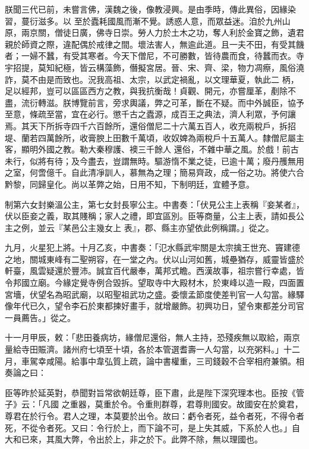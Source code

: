 \begin{pinyinscope}
 朕聞三代已前，未嘗言佛，漢魏之後，像教浸興。是由季時，傳此異俗，因緣染習，蔓衍滋多。以
 至於蠹耗國風而漸不覺。誘惑人意，而眾益迷。洎於九州山原，兩京關，僧徒日廣，佛寺日崇。勞人力於土木之功，奪人利於金寶之飾，遺君親於師資之際，違配偶於戒律之間。壞法害人，無逾此道。且一夫不田，有受其饑者；一婦不蠶，有受其寒者。今天下僧尼，不可勝數，皆待農而食，待蠶而衣。寺宇招提，莫知紀極，皆云構藻飾，僭擬宮居。晉、宋、齊、梁，物力凋瘵，風俗澆詐，莫不由是而致也。況我高祖、太宗，以武定禍亂，以文理華夏，執此二
 柄，足以經邦，豈可以區區西方之教，與我抗衡哉！貞觀、開元，亦嘗厘革，剷除不盡，流衍轉滋。朕博覽前言，旁求輿議，弊之可革，斷在不疑。而中外誠臣，協予至意，條疏至當，宜在必行。懲千古之蠹源，成百王之典法，濟人利眾，予何讓焉。其天下所拆寺四千六百餘所，還俗僧尼二十六萬五百人，收充兩稅戶，拆招堤、蘭若四萬餘所，收膏腴上田數千萬頃，收奴婢為兩稅戶十五萬人。隸僧尼屬主客，顯明外國之教。勒大秦穆護、襖三千餘人
 還俗，不雜中華之風。於戲！前古未行，似將有待；及今盡去，豈謂無時。驅游惰不業之徒，已逾十萬；廢丹雘無用之室，何啻億千。自此清凈訓人，慕無為之理；簡易齊政，成一俗之功。將使六合黔黎，同歸皇化。尚以革弊之始，日用不知，下制明廷，宜體予意。



 制第六女封樂溫公主，第七女封長寧公主。中書奏：「伏見公主上表稱『妾某者』，伏以臣妾之義，取其賤稱；家人之禮，即宜區別。臣等商量，公主上表，請如長公主之例，並云『某邑公主幾女上
 表』，郡、縣主亦望依此例稱謂。」從之。



 九月，火星犯上將。十月乙亥，中書奏：「氾水縣武牢關是太宗擒王世充、竇建德之地，關城東峰有二聖朔容，在一堂之內。伏以山河如舊，城壘猶存，威靈皆盛於軒臺，風雲疑還於豐沛。誠宜百代嚴奉，萬邦式瞻。西漢故事，祖宗嘗行幸處，皆令邦國立廟。今緣定覺寺例合毀拆。望取寺中大殿材木，於東峰以造一殿，四面置宮墻，伏望名為昭武廟，以昭聖祖武功之盛。委懷孟節度使差判官一人勾當。緣驛
 像年代已久，望令李石於東都揀好畫手，就增嚴飾。初興功日，望令東都差分司官一員薦告。」從之。



 十一月甲辰，敕：「悲田養病坊，緣僧尼還俗，無人主持，恐殘疾無以取給，兩京量給寺田賑濟。諸州府七頃至十頃，各於本管選耆壽一人勾當，以充粥料。」十二月，車駕幸咸陽。給事中韋弘質上疏，論中書權重，三司錢穀不合宰相府兼領。相奏論之曰：



 臣等昨於延英對，恭聞對旨常欲朝廷尊，臣下肅，此是陛下深究理本也。臣按《管子》云：「凡國
 之重器，莫重於令。令重則群尊，君尊則國安。故國安在於奠君，尊君在於行令。君人之理，本莫要於出令。故曰：虧令者死，益令者死，不得令者死，不從令者死。又曰：令行於上，而下論不可，是上失其威，下系於人也。」自大和已來，其風大弊，令出於上，非之於下。此弊不除，無以理國也。




\end{pinyinscope}
